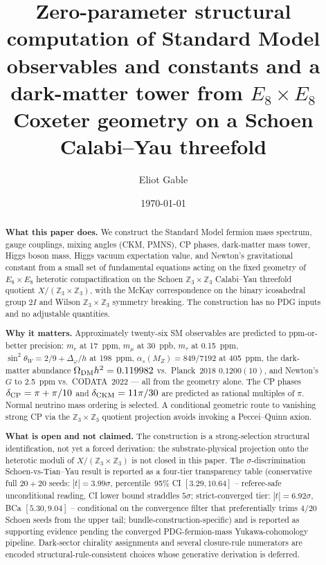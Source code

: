 ﻿\documentclass[reprint,amsmath,amssymb,aps,prd,longbibliography,floatfix]{revtex4-2}
\begin{document}
\title{Zero-parameter structural computation of Standard Model observables and constants and
a dark-matter tower from $E_8 \times E_8$ Coxeter geometry on a Schoen Calabi--Yau threefold}

\author{Eliot Gable}

\date{\today}

\begin{abstract}
\noindent\textbf{What this paper does.}
We construct the Standard Model fermion mass spectrum, gauge couplings, mixing angles (CKM, PMNS), CP phases, dark-matter mass tower, Higgs boson mass, Higgs vacuum expectation value, and Newton's gravitational constant from a small set of fundamental equations acting on the fixed geometry of $E_8 \times E_8$ heterotic compactification on the Schoen $\mathbb{Z}_3 \times \mathbb{Z}_3$ Calabi--Yau threefold quotient $X/(\mathbb{Z}_3 \times \mathbb{Z}_3)$, with the McKay correspondence on the binary icosahedral group $2I$ and Wilson $\mathbb{Z}_3 \times \mathbb{Z}_3$ symmetry breaking. The construction has no PDG inputs and no adjustable quantities.

\noindent\textbf{Why it matters.}
Approximately twenty-six SM observables are predicted to ppm-or-better precision: $m_e$ at \SI{17}{ppm}, $m_\mu$ at \SI{30}{ppb}, $m_\tau$ at \SI{0.15}{ppm}, $\sin^2 \theta_W = 2/9 + \Delta_\varphi/h$ at \SI{198}{ppm}, $\alpha_s(M_Z) = 849/7192$ at \SI{405}{ppm}, the dark-matter abundance $\Omega_{\rm DM} h^2 = 0.119982$ vs.\ Planck~2018 $0.1200(10)$, and Newton's $G$ to \SI{2.5}{ppm} vs.\ CODATA~2022 --- all from the geometry alone. The CP phases $\delta_{\rm CP} = \pi + \pi/10$ and $\delta_{\rm CKM} = 11\pi/30$ are predicted as rational multiples of $\pi$. Normal neutrino mass ordering is selected. A conditional geometric route to vanishing strong CP via the $\mathbb{Z}_3 \times \mathbb{Z}_3$ quotient projection avoids invoking a Peccei--Quinn axion.

\noindent\textbf{What is open and not claimed.}
The construction is a strong-selection structural identification, not yet a forced derivation: the substrate-physical projection onto the heterotic moduli of $X/(\mathbb{Z}_3 \times \mathbb{Z}_3)$ is not closed in this paper. The $\sigma$-discrimination Schoen-vs-Tian--Yau result is reported as a four-tier transparency table (conservative full $20{+}20$ seeds: $|t| = 3.99\sigma$, percentile~95\% CI $[3.29, 10.64]$ -- referee-safe unconditional reading, CI lower bound straddles $5\sigma$; strict-converged tier: $|t| = 6.92\sigma$, BCa $[5.30, 9.04]$ -- conditional on the convergence filter that preferentially trims $4/20$ Schoen seeds from the upper tail; bundle-construction-specific) and is reported as supporting evidence pending the converged PDG-fermion-mass Yukawa-cohomology pipeline. Dark-sector chirality assignments and several closure-rule numerators are encoded structural-rule-consistent choices whose generative derivation is deferred.
\end{abstract}
\end{document}
